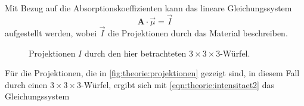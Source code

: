     Mit Bezug auf die Absorptionskoeffizienten kann das lineare Gleichungssystem
    \begin{equation}
        \symbf{A} \cdot \vec{\mu} = \vec{I}
    \end{equation}
    aufgestellt werden,
    wobei $\vec{I}$ die Projektionen durch das Material beschreiben.
    \begin{figure}
        \centering
        \caption{Projektionen $I$ durch den hier betrachteten $3\times3\times3$-Würfel.}
        \label{fig:theorie:projektionen}
    \end{figure}
    Für die Projektionen,
    die in \autoref{fig:theorie:projektionen} gezeigt sind,
    in diesem Fall durch einen $3\times3\times3$-Würfel,
    ergibt sich mit \autoref{eqn:theorie:intensitaet2} das Gleichungssystem
